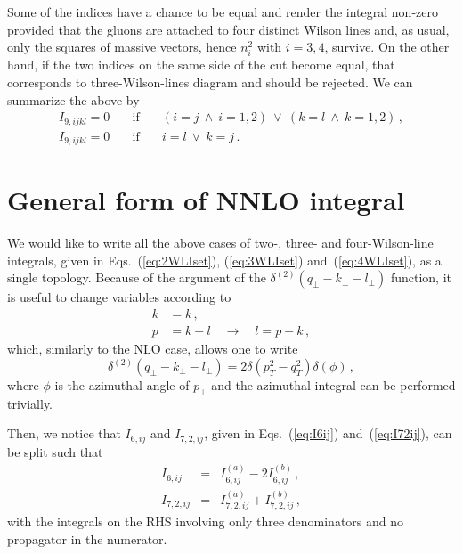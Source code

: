 \documentclass[a4paper,11pt]{report}
\numberwithin{equation}{section}
\begin{document}
Some of the indices have a chance to be equal and render the integral non-zero
provided that the gluons are attached to four distinct Wilson lines and, as
usual, only the squares of massive vectors, hence $n_i^2$ with $i=3,4$, survive.
On the other hand, if the two indices on the same side of the cut become equal,
that corresponds to three-Wilson-lines diagram and should be rejected.
We can summarize the above by
%
\begin{equation}
  \begin{array}{ccc}
  I_{9, ijkl} = 0  &\quad \text{if} \quad & (i=j\ \land\ i = 1,2)\ \lor\
                                            (k=l\ \land\ k = 1,2)\,,
  \\[0.5em]
  I_{9, ijkl} = 0  &\quad \text{if} \quad & i=l\ \lor\ k=j\,.
  \end{array}
\end{equation}

\section{General form of NNLO integral}

We would like to write all the above cases of two-, three- and four-Wilson-line
integrals, given in Eqs.~(\ref{eq:2WLIset}), (\ref{eq:3WLIset})
and~(\ref{eq:4WLIset}), as a single topology. 
%
Because of the argument of the $\delta^{(2)}(q_\perp-k_\perp-l_\perp)$ function,
it is useful to change variables according to
%
\begin{subequations}
\begin{align}
  k &= k\,,  \\
  p &= k+l \quad \to \quad l = p-k\,, 
  \label{eq:p-def}
\end{align}
\end{subequations}
%
which, similarly to the NLO case, allows one to write
%
\begin{equation}
  \delta^{(2)}(q_\perp-k_\perp-l_\perp) = 2 \delta(p_T^2-q_T^2) \delta(\phi)\,,
\end{equation}
%
where $\phi$ is the azimuthal angle of $p_\perp$ and the azimuthal integral
can be performed trivially.

Then, we notice that $I_{6,ij}$ and $I_{7,2,ij}$, given in Eqs.~(\ref{eq:I6ij})
and~(\ref{eq:I72ij}), can be split such that
%
\begin{eqnarray}
  I_{6,ij} & = & I^{(a)}_{6,ij} - 2 I^{(b)}_{6,ij}\,, \\
  I_{7,2,ij} & = &  I^{(a)}_{7,2,ij} + I^{(b)}_{7,2,ij}\,,
\end{eqnarray}
%
with the integrals on the RHS involving only three denominators and no
propagator in the numerator.
\end{document}
